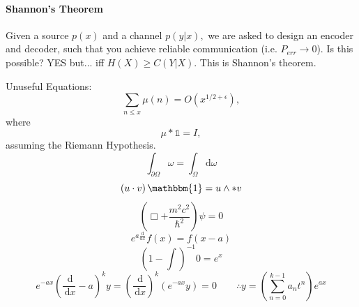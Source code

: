 \documentclass[12pt]{article}
\newcommand{\diffn}[1]{\,\mathrm{d}{#1}}
\newcommand{\fdiffn}[2]{\frac{\diffn{#1}}{\diffn{#2}}}
\begin{document}
\paragraph{Shannon's Theorem}
Given a source $p(x)$ and a channel $p(y|x),$ we are asked to design an encoder and decoder, such that you achieve reliable communication (i.e. $P_{err}\to 0$). Is this possible? YES but... iff $H(X)\ge C(Y|X).$ This is Shannon's theorem.


\newpage
Unuseful Equations:
\[\sum_{n\le x}\mu(n)=O\left(x^{1/2+\epsilon}\right),\]
where 
\[\mu\ast\mathds{1} = I,\] assuming the Riemann Hypothesis.
\[\int_{\partial\Omega}\omega = \int_{\Omega}\mathrm{d}\omega\]
\[\left(u \cdot v\right) \mathbbm{1} = u \wedge \ast v\]
\[\left(\Box+\frac{m^2c^2}{\hbar^2}\right)\psi = 0\]
\[e^{a \frac{\mathrm{d}}{\mathrm{d}x}} f(x) = f(x - a)\]
\[\left(1 - \int \right)^{-1} 0 = e^x\]
\[
e^{-a x} \left(\fdiffn{}{x} - a\right)^k y = \left(\fdiffn{}{x}\right)^k (e^{-a x} y) = 0 \qquad \therefore y = \left(\sum_{n=0}^{k-1} a_n t^n\right) e^{a x}
\]
\end{document}
